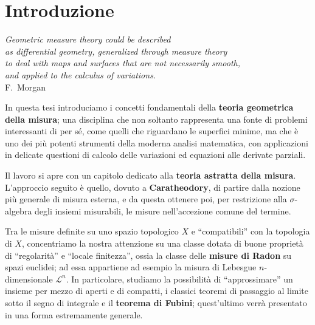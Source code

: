 \documentclass[a4paper,10pt,openright,oneside]{book}
\theoremstyle{theoremstyle}
\theoremstyle{theoremstylewoheader}
\theoremstyle{theoremstyle}
\theoremstyle{proofsecstyle}
\theoremstyle{nonumberplain}
\newcommand{\Leb}{\ensuremath{\mathcal{L}}}
\begin{document}

\tableofcontents
{}


\chapter*{Introduzione}

\begin{flushright}
\emph{Geometric measure theory could be described\\
as differential geometry, generalized through measure theory\\
to deal with maps and surfaces that are not necessarily smooth,\\
and applied to the calculus of variations.}\\
F.~Morgan
\end{flushright}\vspace{2em}

\noindent In questa tesi introduciamo i concetti fondamentali della {\bfseries teoria geometrica della misura}; una disciplina che non soltanto rappresenta una fonte di problemi interessanti di per sé, come quelli che riguardano le superfici minime, ma che è uno dei più potenti strumenti della moderna analisi matematica, con applicazioni in delicate questioni di calcolo delle variazioni ed equazioni alle derivate parziali.

Il lavoro si apre con un capitolo dedicato alla {\bfseries teoria astratta della misura}. L'approccio seguito è quello, dovuto a {\bfseries Caratheodory}, di partire dalla nozione più generale di misura esterna, e da questa ottenere poi, per restrizione alla $\sigma$-algebra degli insiemi misurabili, le misure nell'accezione comune del termine.

Tra le misure definite su uno spazio topologico $X$ e ``compatibili'' con la topologia di $X$, concentriamo la nostra attenzione su una classe dotata di buone proprietà di ``regolarità'' e ``locale finitezza'', ossia la classe delle {\bfseries misure di Radon} su spazi euclidei; ad essa appartiene ad esempio la misura di Lebesgue $n$-dimensionale $\Leb^n$. In particolare, studiamo la possibilità di ``approssimare'' un insieme per mezzo di aperti e di compatti, i classici teoremi di passaggio al limite sotto il segno di integrale e il {\bfseries teorema di Fubini}; quest'ultimo verrà presentato in una forma estremamente generale.
\end{document}
